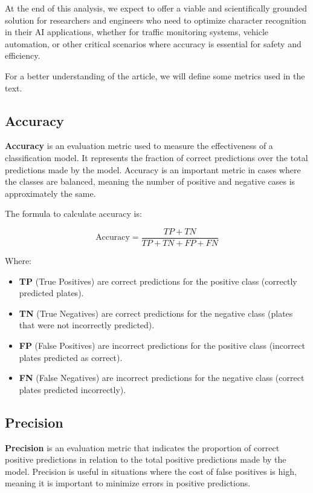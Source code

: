 \documentclass[conference]{IEEEtran}
\begin{document}
	At the end of this analysis, we expect to offer a viable and scientifically grounded solution for researchers and engineers who need to optimize character recognition in their AI applications, whether for traffic monitoring systems, vehicle automation, or other critical scenarios where accuracy is essential for safety and efficiency.
	
	For a better understanding of the article, we will define some metrics used in the text.
	
	\subsection{Accuracy}
	
	\textbf{Accuracy} is an evaluation metric used to measure the effectiveness of a classification model. It represents the fraction of correct predictions over the total predictions made by the model. Accuracy is an important metric in cases where the classes are balanced, meaning the number of positive and negative cases is approximately the same.
	
	The formula to calculate accuracy is:
	
	\[
	\text{Accuracy} = \frac{TP + TN}{TP + TN + FP + FN}
	\]
	
	Where:
	
	\begin{itemize}
		\item \textbf{TP} (True Positives) are correct predictions for the positive class (correctly predicted plates).
		\item \textbf{TN} (True Negatives) are correct predictions for the negative class (plates that were not incorrectly predicted).
		\item \textbf{FP} (False Positives) are incorrect predictions for the positive class (incorrect plates predicted as correct).
		\item \textbf{FN} (False Negatives) are incorrect predictions for the negative class (correct plates predicted incorrectly).
	\end{itemize}
	
	\subsection{Precision}
	
	\textbf{Precision} is an evaluation metric that indicates the proportion of correct positive predictions in relation to the total positive predictions made by the model. Precision is useful in situations where the cost of false positives is high, meaning it is important to minimize errors in positive predictions.
	
\end{document}
